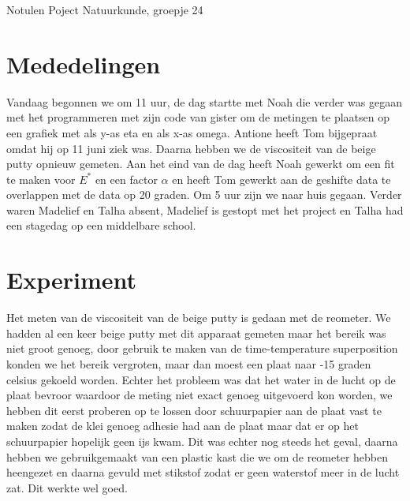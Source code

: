 \documentclass[11pt,a4paper]{article}
\begin{document}
\begin{Minutes}{Notulen Poject Natuurkunde, groepje 24}


\endtime{}
\location{}




\maketitle



\newpage


\section{Mededelingen} 
Vandaag begonnen we om 11 uur, de dag startte met Noah die verder was gegaan met het programmeren met zijn code van gister om de metingen te plaatsen op een grafiek met als y-as eta en als x-as omega. Antione heeft Tom bijgepraat omdat hij op 11 juni ziek was. Daarna hebben we de viscositeit van de beige putty opnieuw gemeten. Aan het eind van de dag heeft Noah gewerkt om een fit te maken voor $E^*$ en een factor $\alpha$ en heeft Tom gewerkt aan de geshifte data te overlappen met de data op 20 graden. Om 5 uur zijn we naar huis gegaan. Verder waren Madelief en Talha absent, Madelief is gestopt met het project en Talha had een stagedag op een middelbare school.

\section{Experiment}
Het meten van de viscositeit van de beige putty is gedaan met de reometer. We hadden al een keer beige putty met dit apparaat gemeten maar het bereik was niet groot genoeg, door gebruik te maken van de time-temperature superposition konden we het bereik vergroten, maar dan moest een plaat naar -15 graden celsius gekoeld worden. Echter het probleem was dat het water in de lucht op de plaat bevroor waardoor de meting niet exact genoeg uitgevoerd kon worden, we hebben dit eerst proberen op te lossen door schuurpapier aan de plaat vast te maken zodat de klei genoeg adhesie had aan de plaat maar dat er op het schuurpapier hopelijk geen ijs kwam. Dit was echter nog steeds het geval, daarna hebben we gebruikgemaakt van een plastic kast die we om de reometer hebben heengezet en daarna gevuld met stikstof zodat er geen waterstof meer in de lucht zat. Dit werkte wel goed. 



\end{Minutes}
\end{document}
